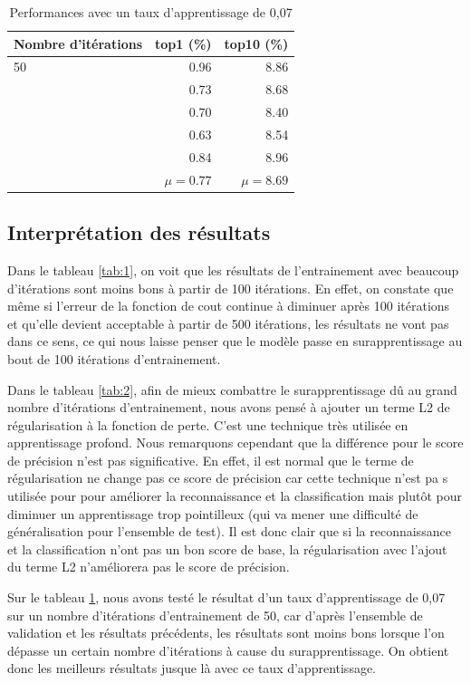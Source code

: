 \documentclass{article}
\begin{document}
\begin{table}[htbp]
\centering
\begin{tabular}{lrr}  
\toprule
Nombre d'itérations & top1 (\%) & top10 (\%) \\
\midrule
50 & 0.96 & 8.86 \\
     & 0.73 & 8.68 \\
     & 0.70 & 8.40 \\
     & 0.63 & 8.54 \\
     & 0.84 & 8.96 \\
     & $\mu = 0.77$ &  $\mu = 8.69$ \\
\bottomrule
\end{tabular}
\caption{Performances avec un taux d'apprentissage de 0,07}
\label{tab:3}
\end{table}

\subsection{Interprétation des résultats}
Dans le tableau \ref{tab:1}, on voit que les résultats de l’entrainement avec
beaucoup d’itérations sont moins bons à partir de 100 itérations. En effet, on
constate que même si l’erreur de la fonction de cout continue à diminuer après
100 itérations et qu’elle devient acceptable à partir de 500 itérations, les
résultats ne vont pas dans ce sens, ce qui nous laisse penser que le modèle
passe en surapprentissage au bout de 100 itérations d’entrainement.

Dans le tableau \ref{tab:2}, afin de mieux combattre le surapprentissage dû au
grand nombre d'itérations d'entrainement, nous avons pensé à ajouter un terme L2
de régularisation à la fonction de perte. C'est une technique très utilisée
en apprentissage profond. Nous remarquons cependant que la différence pour le score
de précision n'est pas significative. En effet, il est normal que le terme de
régularisation ne change pas ce score de précision car cette technique n'est pa
s utilisée pour pour améliorer la reconnaissance et la classification mais plutôt
pour diminuer un apprentissage trop pointilleux (qui va mener une difficulté de
généralisation pour l'ensemble de test). Il est donc clair que si la reconnaissance
et la classification n'ont pas un bon score de base, la régularisation avec l'ajout
du terme L2 n'améliorera pas le score de précision.

Sur le tableau \ref{tab:3}, nous avons testé le résultat d'un taux
d'apprentissage de 0,07 sur un nombre d'itérations d'entrainement de 50, car
d'après l'ensemble de validation et les résultats précédents, les résultats sont
moins bons lorsque l'on dépasse un certain nombre d'itérations à cause du
surapprentissage. On obtient donc les meilleurs résultats jusque là avec ce taux
d'apprentissage.
\end{document}
